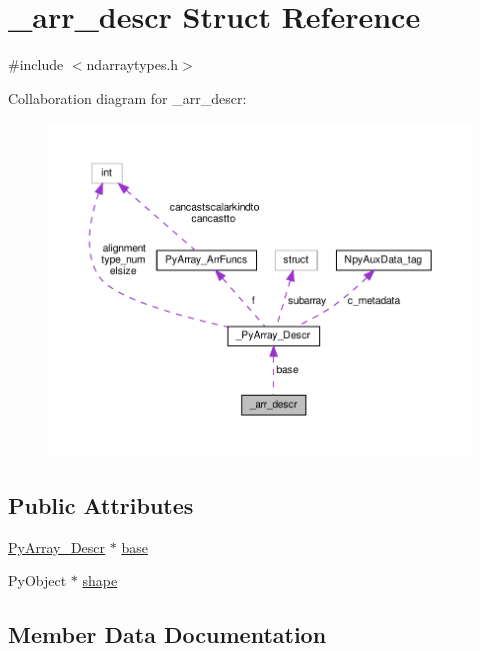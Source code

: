 \hypertarget{struct__arr__descr}{}\section{\+\_\+arr\+\_\+descr Struct Reference}
\label{struct__arr__descr}


{\ttfamily \#include $<$ndarraytypes.\+h$>$}



Collaboration diagram for \+\_\+arr\+\_\+descr\+:
\nopagebreak
\begin{figure}[H]
\begin{center}
\leavevmode
\includegraphics[width=350pt]{struct__arr__descr__coll__graph}
\end{center}
\end{figure}
\subsection*{Public Attributes}
\begin{DoxyCompactItemize}
\item 
\hyperlink{ndarraytypes_8h_a08fb2fb967ebbdd179e08d7b8756bd75}{Py\+Array\+\_\+\+Descr} $\ast$ \hyperlink{struct__arr__descr_ae1d5e82fb81269a38920fecfe1b303a9}{base}
\item 
Py\+Object $\ast$ \hyperlink{struct__arr__descr_a21331efd549b036c2c1f4e00b74a6307}{shape}
\end{DoxyCompactItemize}


\subsection{Member Data Documentation}
\mbox{\label{struct__arr__descr_ae1d5e82fb81269a38920fecfe1b303a9}} 

